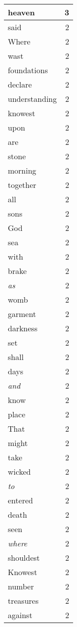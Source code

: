 \begin{center}
\begin{longtable}{l|r}
heaven & 3 \\ \hline
said & 2 \\ \hline
Where & 2 \\ \hline
wast & 2 \\ \hline
foundations & 2 \\ \hline
declare & 2 \\ \hline
understanding & 2 \\ \hline
knowest & 2 \\ \hline
upon & 2 \\ \hline
are & 2 \\ \hline
stone & 2 \\ \hline
morning & 2 \\ \hline
together & 2 \\ \hline
all & 2 \\ \hline
sons & 2 \\ \hline
God & 2 \\ \hline
sea & 2 \\ \hline
with & 2 \\ \hline
brake & 2 \\ \hline
\emph{as} & 2 \\ \hline
womb & 2 \\ \hline
garment & 2 \\ \hline
darkness & 2 \\ \hline
set & 2 \\ \hline
shall & 2 \\ \hline
days & 2 \\ \hline
\emph{and} & 2 \\ \hline
know & 2 \\ \hline
place & 2 \\ \hline
That & 2 \\ \hline
might & 2 \\ \hline
take & 2 \\ \hline
wicked & 2 \\ \hline
\emph{to} & 2 \\ \hline
entered & 2 \\ \hline
death & 2 \\ \hline
seen & 2 \\ \hline
\emph{where} & 2 \\ \hline
shouldest & 2 \\ \hline
Knowest & 2 \\ \hline
number & 2 \\ \hline
treasures & 2 \\ \hline
against & 2 \\ \hline

\end{longtable}
\end{center}
